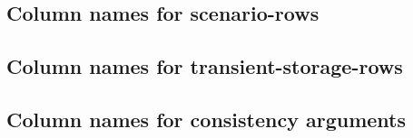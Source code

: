 \subsection{Column names for scenario-rows            \lispDone{}}    \label{hub: scenario columns}                
\subsection{Column names for transient-storage-rows   \lispDone{}}    \label{hub: transient storage columns}       
\subsection{Column names for consistency arguments    \lispDone{}}    \label{hub: consistency argument columns}    
